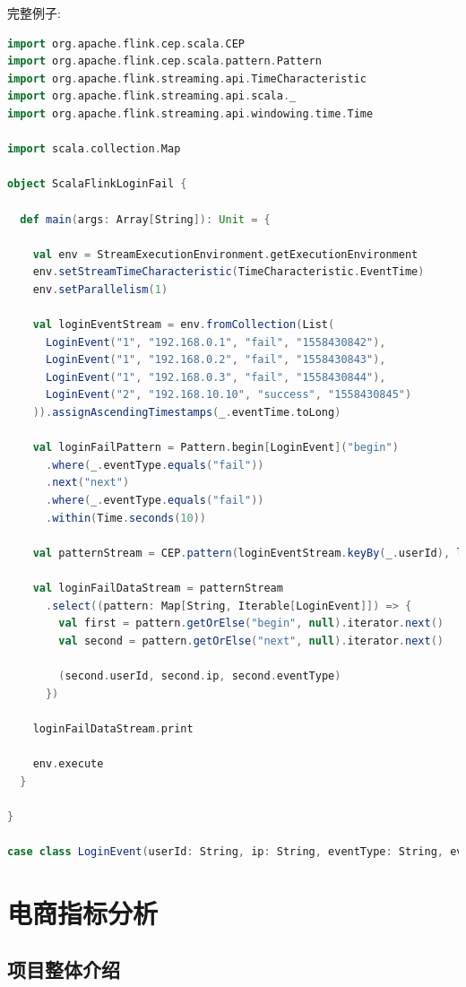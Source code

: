 \documentclass[oneside]{ctexbook}
\begin{document}
完整例子:

\begin{lstlisting}[language=scala]
import org.apache.flink.cep.scala.CEP
import org.apache.flink.cep.scala.pattern.Pattern
import org.apache.flink.streaming.api.TimeCharacteristic
import org.apache.flink.streaming.api.scala._
import org.apache.flink.streaming.api.windowing.time.Time

import scala.collection.Map

object ScalaFlinkLoginFail {

  def main(args: Array[String]): Unit = {

    val env = StreamExecutionEnvironment.getExecutionEnvironment
    env.setStreamTimeCharacteristic(TimeCharacteristic.EventTime)
    env.setParallelism(1)

    val loginEventStream = env.fromCollection(List(
      LoginEvent("1", "192.168.0.1", "fail", "1558430842"),
      LoginEvent("1", "192.168.0.2", "fail", "1558430843"),
      LoginEvent("1", "192.168.0.3", "fail", "1558430844"),
      LoginEvent("2", "192.168.10.10", "success", "1558430845")
    )).assignAscendingTimestamps(_.eventTime.toLong)

    val loginFailPattern = Pattern.begin[LoginEvent]("begin")
      .where(_.eventType.equals("fail"))
      .next("next")
      .where(_.eventType.equals("fail"))
      .within(Time.seconds(10))

    val patternStream = CEP.pattern(loginEventStream.keyBy(_.userId), loginFailPattern)

    val loginFailDataStream = patternStream
      .select((pattern: Map[String, Iterable[LoginEvent]]) => {
        val first = pattern.getOrElse("begin", null).iterator.next()
        val second = pattern.getOrElse("next", null).iterator.next()

        (second.userId, second.ip, second.eventType)
      })

    loginFailDataStream.print

    env.execute
  }

}

case class LoginEvent(userId: String, ip: String, eventType: String, eventTime: String)
\end{lstlisting}

\chapter{电商指标分析}

\section{项目整体介绍}
\end{document}
